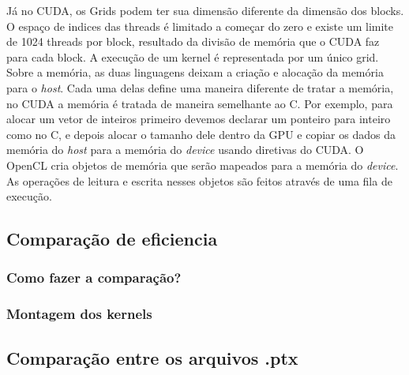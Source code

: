 Já no CUDA, os Grids podem ter sua dimensão diferente da dimensão dos blocks. O espaço de indices das threads é limitado a começar 
do zero e existe um limite de 1024 threads por block, resultado da divisão de memória que o CUDA faz para cada block. A execução
de um kernel é representada por um único grid.
\\

Sobre a memória, as duas linguagens deixam a criação e alocação da memória para o \textit{host}. Cada uma delas define uma maneira
diferente de tratar a memória, no CUDA a memória é tratada de maneira semelhante ao C. Por exemplo, para alocar um vetor de inteiros
primeiro devemos declarar um ponteiro para inteiro como no C, e depois alocar o tamanho dele dentro da GPU e copiar os dados da 
memória do \textit{host} para a memória do \textit{device} usando diretivas do CUDA. O OpenCL cria objetos de memória que serão
mapeados para a memória do \textit{device}. As operações de leitura e escrita nesses objetos são feitos através de uma fila de 
execução.
\subsection{Comparação de eficiencia}
\subsubsection{Como fazer a comparação?}
\subsubsection{Montagem dos kernels}
\subsection{Comparação entre os arquivos .ptx}
